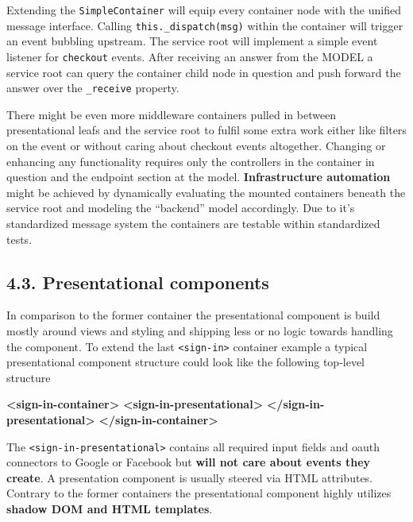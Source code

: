 \documentclass[]{article}
\newenvironment{Shaded}{}{}
\newcommand{\KeywordTok}[1]{\textcolor[rgb]{0.00,0.44,0.13}{\textbf{{#1}}}}
\begin{document}
Extending the \texttt{SimpleContainer} will equip every container node
with the unified message interface. Calling
\texttt{this.\_dispatch(msg)} within the container will trigger an event
bubbling upstream. The service root will implement a simple event
listener for \texttt{checkout} events. After receiving an answer from
the MODEL a service root can query the container child node in question
and push forward the answer over the \texttt{\_receive} property.

There might be even more middleware containers pulled in between
presentational leafs and the service root to fulfil some extra work
either like filters on the event or without caring about checkout events
altogether. Changing or enhancing any functionality requires only the
controllers in the container in question and the endpoint section at the
model. \textbf{Infrastructure automation} might be achieved by
dynamically evaluating the mounted containers beneath the service root
and modeling the ``backend'' model accordingly. Due to it's standardized
message system the containers are testable within standardized tests.

\subsection{4.3. Presentational
components}\label{presentational-components}

In comparison to the former container the presentational component is
build mostly around views and styling and shipping less or no logic
towards handling the component. To extend the last
\texttt{\textless{}sign-in\textgreater{}} container example a typical
presentational component structure could look like the following
top-level structure

\begin{Shaded}
\begin{Highlighting}[]
\KeywordTok{<sign-in-container>}
  \KeywordTok{<sign-in-presentational>}
  \KeywordTok{</sign-in-presentational>}
\KeywordTok{</sign-in-container>}
\end{Highlighting}
\end{Shaded}

The \texttt{\textless{}sign-in-presentational\textgreater{}} contains
all required input fields and oauth connectors to Google or Facebook but
\textbf{will not care about events they create}. A presentation
component is usually steered via HTML attributes. Contrary to the former
containers the presentational component highly utilizes \textbf{shadow
DOM and HTML templates}.
\end{document}

